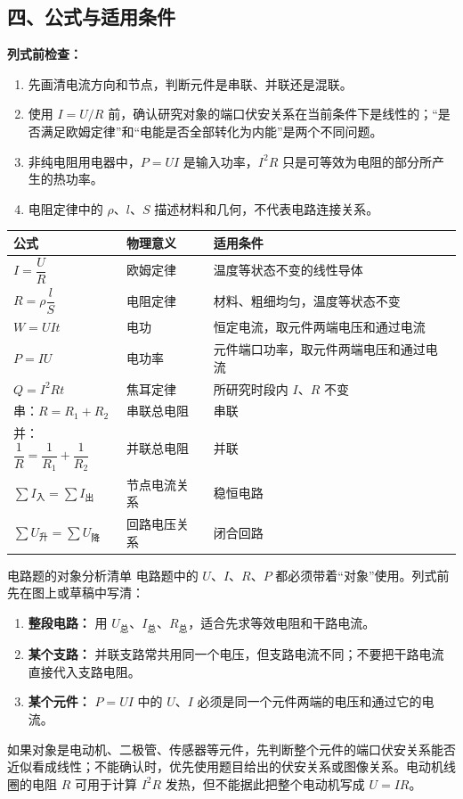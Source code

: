 \begin{samepage}
\section*{四、公式与适用条件}

\textbf{列式前检查：}
\nopagebreak[4]
\begin{enumerate}
  \item 先画清电流方向和节点，判断元件是串联、并联还是混联。
  \item 使用 $I=U/R$ 前，确认研究对象的端口伏安关系在当前条件下是线性的；“是否满足欧姆定律”和“电能是否全部转化为内能”是两个不同问题。
  \item 非纯电阻用电器中，$P=UI$ 是输入功率，$I^2R$ 只是可等效为电阻的部分所产生的热功率。
  \item 电阻定律中的 $\rho$、$l$、$S$ 描述材料和几何，不代表电路连接关系。
\end{enumerate}
\end{samepage}

\begin{center}
\begin{tabular}{lll}
\toprule
公式 & 物理意义 & 适用条件 \\
\midrule
$I = \dfrac{U}{R}$ & 欧姆定律 & 温度等状态不变的线性导体 \\
$R = \rho\dfrac{l}{S}$ & 电阻定律 & 材料、粗细均匀，温度等状态不变 \\
$W = UIt$ & 电功 & 恒定电流，取元件两端电压和通过电流 \\
$P = IU$ & 电功率 & 元件端口功率，取元件两端电压和通过电流 \\
$Q = I^2Rt$ & 焦耳定律 & 所研究时段内 $I$、$R$ 不变 \\
串：$R = R_1 + R_2$ & 串联总电阻 & 串联 \\
并：$\dfrac{1}{R} = \dfrac{1}{R_1} + \dfrac{1}{R_2}$ & 并联总电阻 & 并联 \\
$\sum I_{\text{入}}=\sum I_{\text{出}}$ & 节点电流关系 & 稳恒电路 \\
$\sum U_{\text{升}}=\sum U_{\text{降}}$ & 回路电压关系 & 闭合回路 \\
\bottomrule
\end{tabular}
\end{center}

\begin{learningbox}{电路题的对象分析清单}
电路题中的 $U$、$I$、$R$、$P$ 都必须带着“对象”使用。列式前先在图上或草稿中写清：
\begin{enumerate}
  \item \textbf{整段电路：} 用 $U_{\text{总}}$、$I_{\text{总}}$、$R_{\text{总}}$，适合先求等效电阻和干路电流。
  \item \textbf{某个支路：} 并联支路常共用同一个电压，但支路电流不同；不要把干路电流直接代入支路电阻。
  \item \textbf{某个元件：} $P=UI$ 中的 $U$、$I$ 必须是同一个元件两端的电压和通过它的电流。
\end{enumerate}
如果对象是电动机、二极管、传感器等元件，先判断整个元件的端口伏安关系能否近似看成线性；不能确认时，优先使用题目给出的伏安关系或图像关系。电动机线圈的电阻 $R$ 可用于计算 $I^2R$ 发热，但不能据此把整个电动机写成 $U=IR$。
\end{learningbox}

